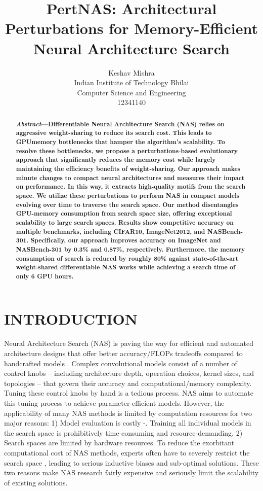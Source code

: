 \documentclass[onecolumn]{IEEEtran}
\title{\textbf{PertNAS: Architectural Perturbations for Memory-Efficient Neural Architecture Search}}
\author{Keshav Mishra\\Indian Institute of Technology Bhilai\\Computer Science and Engineering\\12341140}
\date{}
\begin{document}
\maketitle

\begin{abstract}
	\textbf{\textit{Abstract}—Differentiable Neural Architecture Search (NAS) relies on aggressive weight-sharing to reduce its search cost. This leads to GPUmemory bottlenecks that hamper the algorithm’s scalability. To resolve these bottlenecks, we propose a perturbations-based evolutionary approach that significantly reduces the memory cost while largely maintaining the efficiency benefits of weight-sharing. Our approach makes minute changes to compact neural architectures and measures their impact on performance. In this way, it extracts high-quality motifs from the search space. We utilize these perturbations to perform NAS in compact models evolving over time to traverse the search space. Our method disentangles GPU-memory consumption from search space size, offering exceptional scalability to large search spaces. Results show competitive accuracy on multiple benchmarks, including CIFAR10, ImageNet2012, and NASBench-301. Specifically, our approach improves accuracy on	ImageNet and NASBench-301 by 0.3\% and 0.87\%, respectively. Furthermore, the memory consumption of search is reduced by roughly 80\% against state-of-the-art weight-shared differentiable NAS works while achieving a search time of only 6 GPU hours.}
\end{abstract}

\section{INTRODUCTION}
Neural Architecture Search (NAS) is paving the way for efficient and automated architecture designs that offer better accuracy/FLOPs tradeoffs compared to handcrafted models \cite{Howard2019}. Complex convolutional models consist of a number of control knobs – including architecture depth, operation choices, kernel sizes, and topologies – that govern their accuracy and computational/memory complexity. Tuning these control knobs by hand is a tedious process. NAS aims to automate this tuning process to achieve parameter-efficient models. However, the applicability of many NAS methods is limited by computation resources for two major reasons: 1) Model evaluation is costly \cite{Howard2019}-\cite{Tan2019}. Training all individual models in the search space is prohibitively time-consuming and resource-demanding. 2) Search spaces are limited by hardware resources. To reduce the exorbitant computational cost of NAS methods, experts often have to severely restrict the search space \cite{Zoph2017, Liu2018}, leading to serious inductive biases and sub-optimal solutions. These two reasons make NAS research fairly expensive and seriously limit the scalability of existing solutions.
\end{document}
